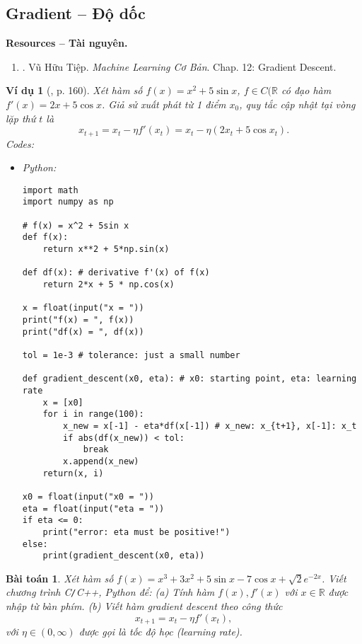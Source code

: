 \documentclass{article}
\newtheorem{baitoan}{Bài toán}
\newtheorem{vidu}{Ví dụ}
\begin{document}

\subsection{Gradient -- Độ dốc}
\textbf{\textsf{Resources -- Tài nguyên.}}
\begin{enumerate}
	\item \cite{Tiep_ML_co_ban}. {\sc Vũ Hữu Tiệp}. {\it Machine Learning Cơ Bản}. Chap. 12: Gradient Descent.
\end{enumerate}

\begin{vidu}[\cite{Tiep_ML_co_ban}, p. 160]
	Xét hàm số $f(x) = x^2 + 5\sin x$, $f\in C(\mathbb{R}$ có đạo hàm $f'(x) = 2x + 5\cos x$. Giả sử xuất phát từ 1 điểm $x_0$, quy tắc cập nhật tại vòng lặp thứ $t$ là
	\begin{equation*}
		x_{t+1} = x_t - \eta f'(x_t) = x_t - \eta(2x_t + 5\cos x_t).
	\end{equation*}
	Codes:
	\begin{itemize}
		\item Python:
		\begin{verbatim}
import math
import numpy as np

# f(x) = x^2 + 5sin x
def f(x):
    return x**2 + 5*np.sin(x)

def df(x): # derivative f'(x) of f(x)
    return 2*x + 5 * np.cos(x)

x = float(input("x = "))
print("f(x) = ", f(x))
print("df(x) = ", df(x))

tol = 1e-3 # tolerance: just a small number

def gradient_descent(x0, eta): # x0: starting point, eta: learning rate
    x = [x0]
    for i in range(100):
        x_new = x[-1] - eta*df(x[-1]) # x_new: x_{t+1}, x[-1]: x_t
        if abs(df(x_new)) < tol:
            break
        x.append(x_new)
    return(x, i)

x0 = float(input("x0 = "))
eta = float(input("eta = "))
if eta <= 0:
    print("error: eta must be positive!")
else:
    print(gradient_descent(x0, eta))
		\end{verbatim}
	\end{itemize}
\end{vidu}

\begin{baitoan}
	Xét hàm số $f(x) = x^3 + 3x^2 + 5\sin x - 7\cos x + \sqrt{2}e^{-2x}$. Viết chương trình {\sf C{\tt/}C++, Python} để: (a) Tính hàm $f(x),f'(x)$ với $x\in\mathbb{R}$ được nhập từ bàn phím. (b) Viết hàm gradient descent theo công thức
	\begin{equation*}
		x_{t+1} = x_t - \eta f'(x_t),
	\end{equation*}
	với $\eta\in(0,\infty)$ được gọi là {\rm tốc độ học (learning rate)}.
\end{baitoan}
\end{document}
